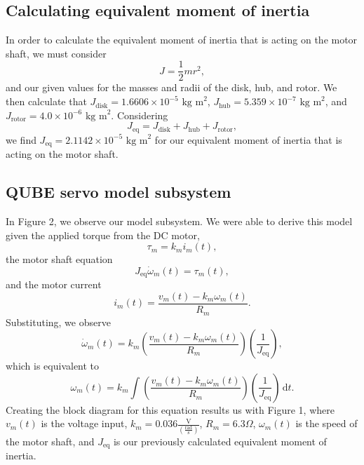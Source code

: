 \documentclass{article}
\begin{document}
\subsection{Calculating equivalent moment of inertia}
In order to calculate the equivalent moment of inertia that is acting on the motor shaft, we must consider
\begin{equation}
    J=\frac{1}{2}mr^2,
\end{equation}
and our given values for the masses and radii of the disk, hub, and rotor. We then calculate that $J_\text{disk}=1.6606\times10^{-5} \text{ kg m}^2$, $J_\text{hub}=5.359\times10^{-7} \text{ kg m}^2$, and $J_\text{rotor}=4.0\times10^{-6} \text{ kg m}^2$. Considering
\begin{equation}
    J_\text{eq}=J_\text{disk}+J_\text{hub}+J_\text{rotor},
\end{equation}
we find $J_\text{eq}=2.1142\times10^{-5}\text{ kg m}^2$ for our equivalent moment of inertia that is acting on the motor shaft.

\subsection{QUBE servo model subsystem}
In Figure 2, we observe our model subsystem. We were able to derive this model given the applied torque from the DC motor,
\begin{equation}
    \tau_m=k_mi_m(t),
\end{equation}
the motor shaft equation
\begin{equation}
    J_\text{eq}\dot\omega_m(t)=\tau_m(t),
\end{equation}
and the motor current
\begin{equation}
    i_m(t)=\frac{v_m(t)-k_m\omega_m(t)}{R_m}.
\end{equation}
Substituting, we observe
\begin{equation}
    \dot\omega_m(t)=k_m \left( \frac{v_m(t)-k_m\omega_m(t)}{R_m} \right)\left(\frac{1}{J_\text{eq}}\right),
\end{equation}
which is equivalent to
\begin{equation}
    \omega_m(t)=k_m\int \left( \frac{v_m(t)-k_m\omega_m(t)}{R_m} \right)\left(\frac{1}{J_\text{eq}}\right)\,\mathrm{d}t.
\end{equation}
Creating the block diagram for this equation results us with Figure 1, where $v_m(t)$ is the voltage input, $k_m=0.036\frac{\text{V}}{(\frac{\text{rad}}{\text{s}})}$, $R_m=6.3\Omega$, $\omega_m(t)$ is the speed of the motor shaft, and $J_\text{eq}$ is our previously calculated equivalent moment of inertia.
\end{document}
